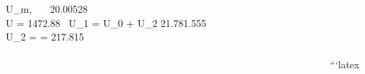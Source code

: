 \Rightarrow U_{m, \, } \,  \, 20.00528 \,  \\

\st{\Rightarrow} \Rightarrow \Delta U = 1472.88 \,  \Rightarrow U_1 = U_0 + U_2 \st{\Rightarrow} 21.781.555 \\

\Rightarrow U_2 =  = 217.815 \\

 \,  \,  \,  \,  \,  \\

\st{} \, \st{} \, \st{} \, \st{} \, \st{} \, \st{} \, \st{} \, \st{} \, \st{} \, \st{} \, \st{} \, \st{} \, \st{} \, \st{} \, \st{} \, \st{} \, \st{} \, \st{} \, \st{} \, \st{} \, \st{} \, \st{} \, \st{} \, \st{} \, \st{} \, \st{} \, \st{} \, \st{} \, \st{} \, \st{} \, \st{} \, \st{} \, \st{} \, \st{} \, \st{} \, \st{} \, \st{} \, \st{} \, \st{} \, \st{} \, \st{} \, \st{} \, \st{} \, \st{} \, \st{} \, \st{} \, \st{} \, \st{} \, \st{} \, \st{} \, \st{} \, \st{} \, \st{} \, \st{} \, \st{} \, \st{} \, \st{} \, \st{} \, \st{} \, \st{} \, \st{} \, \st{} \, \st{} \, \st{} \, \st{} \, \st{}```latex


